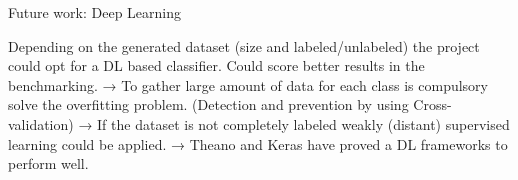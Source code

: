 Future work: Deep Learning

Depending on the generated dataset (size and labeled/unlabeled) the project could opt for a DL based classifier.
Could score better results in the benchmarking.
→ To gather large amount of data for each class is compulsory solve the overfitting problem. (Detection and prevention by using Cross-validation)
→ If the dataset is not completely labeled weakly (distant) supervised learning could be applied.
→ Theano and Keras have proved a DL frameworks to perform well.

